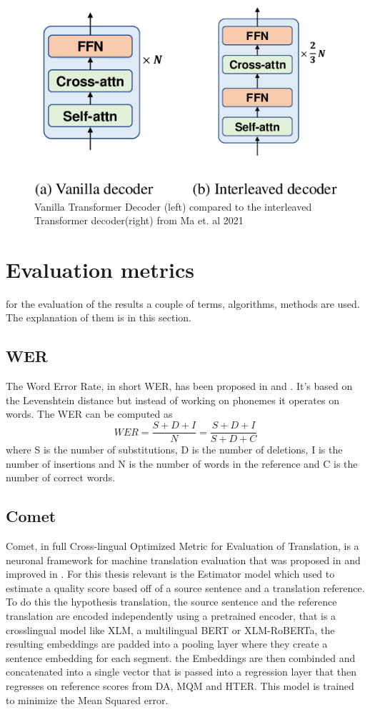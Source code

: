 \begin{figure}
    \centering%
    \includegraphics[width=0.5\linewidth]{Latex/sections/images/interleaveddecoder.png}
    \caption{Vanilla Transformer Decoder (left) compared to the interleaved Transformer decoder(right) from Ma et. al 2021}
    \label{fig:interleaved decoder}
\end{figure}

\section{Evaluation metrics}
 for the evaluation of the results a couple of terms, algorithms, methods are used. The explanation of them is in this section. 
 
\subsection{WER}
\label{wer}
The Word Error Rate, in short WER, has been proposed in \cite{woodard1982} and \cite{morris2004}.
It's based on the Levenshtein distance but instead of working on phonemes it operates on words.
The WER can be computed as $$WER=\frac{S+D+I}{N}=\frac{S+D+I}{S+D+C}$$ where S is the number of substitutions, D is the number of deletions, I is the number of insertions and N is the number of words in the reference and C is the number of correct words.

\subsection{Comet}
Comet, in full Cross-lingual Optimized Metric for Evaluation of Translation, is a neuronal framework for machine translation evaluation that was proposed in \cite{rei-etal-2020-comet} and improved in \cite{rei-etal-2022-comet}.
For this thesis relevant is the Estimator model which used to estimate a quality score based off of a source sentence and a translation reference. 
To do this the hypothesis translation, the source sentence and the reference translation are encoded independently using a pretrained encoder, that is a crosslingual model like XLM, a multilingual BERT or XLM-RoBERTa, the resulting embeddings are padded into a pooling layer where they create a sentence embedding for each segment. the Embeddings are then combinded and concatenated into a single vector that is passed into a regression layer that then regresses on reference scores from DA, MQM and HTER. 
This model is trained to minimize the Mean Squared error. 

